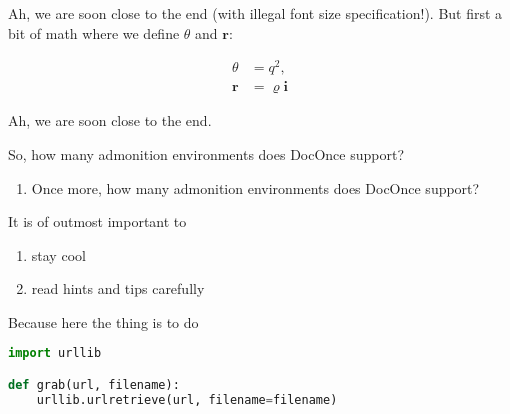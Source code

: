 \documentclass[%
oneside,                 %
final,                   %
10pt]{article}
\newenvironment{notice_mdfboxadmon}[1][]{
\begin{notice_mdfboxmdframed}[frametitle=#1]
}
{
\end{notice_mdfboxmdframed}
}
\newenvironment{warning_mdfboxadmon}[1][]{
\begin{warning_mdfboxmdframed}[frametitle=#1]
}
{
\end{warning_mdfboxmdframed}
}
\newenvironment{question_mdfboxadmon}[1][]{
\begin{question_mdfboxmdframed}[frametitle=#1]
}
{
\end{question_mdfboxmdframed}
}
\begin{document}


\begin{notice_mdfboxadmon}
Ah, we are soon close to the end (with illegal font size specification!).
But first a bit of math where we define $\theta$ and $\bm{r}$:

\begin{align*}
\theta &= q^2,\\
\bm{r} &= \varrho\bm{i}
\end{align*}
\end{notice_mdfboxadmon} %





\begin{notice_mdfboxadmon}[Point1.]
Ah, we are soon close to the end.
\end{notice_mdfboxadmon} %




\begin{question_mdfboxadmon}[Question.]
So, how many admonition environments does DocOnce support?
\end{question_mdfboxadmon} %




\begin{question_mdfboxadmon}[Question.]
\begin{enumerate}
 \item Once more, how many admonition environments does DocOnce support?
\end{enumerate}

\noindent
\end{question_mdfboxadmon} %




\begin{warning_mdfboxadmon}[Tip.]
It is of outmost important to

\begin{enumerate}
\item stay cool

\item read hints and tips carefully
\end{enumerate}

\noindent
Because here the thing is to do

\begin{lstlisting}[language=Python,style=simple,xleftmargin=2mm]
import urllib

def grab(url, filename):
    urllib.urlretrieve(url, filename=filename)
\end{lstlisting}
\end{warning_mdfboxadmon} %
\end{document}
